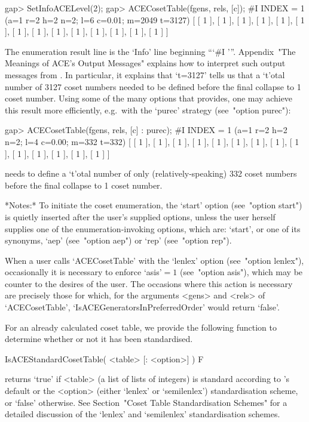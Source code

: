 \beginexample
gap> SetInfoACELevel(2);
gap> ACECosetTable(fgens, rels, [c]);
#I  INDEX = 1 (a=1 r=2 h=2 n=2; l=6 c=0.01; m=2049 t=3127)
[ [ 1 ], [ 1 ], [ 1 ], [ 1 ], [ 1 ], [ 1 ], [ 1 ], [ 1 ], [ 1 ], [ 1 ], 
  [ 1 ], [ 1 ], [ 1 ], [ 1 ] ]
\endexample

The enumeration result line is the `Info' line  beginning  ```\#I '''.
Appendix~"The Meanings of  ACE's  Output  Messages"  explains  how  to
interpret such output messages from {\ACE}. In particular, it explains
that `t=3127' tells us that a `t'otal number  of  3127  coset  numbers
needed to be defined before the final  collapse  to  1  coset  number.
Using some of the many options that {\ACE} provides, one  may  achieve
this  result  more  efficiently,  e.g.~with   the   `purec'   strategy
(see~"option purec"):

\beginexample
gap> ACECosetTable(fgens, rels, [c] : purec);
#I  INDEX = 1 (a=1 r=2 h=2 n=2; l=4 c=0.00; m=332 t=332)
[ [ 1 ], [ 1 ], [ 1 ], [ 1 ], [ 1 ], [ 1 ], [ 1 ], [ 1 ], [ 1 ], [ 1 ], 
  [ 1 ], [ 1 ], [ 1 ], [ 1 ] ]
\endexample

{\ACE} needs to define a `t'otal number of only  (relatively-speaking)
332 coset numbers before the final collapse to 1 coset number.

*Notes:* 
To initiate the coset enumeration,  the  `start'  option  (see~"option
start") is quietly inserted after the user's supplied options,  unless
the user herself supplies one  of  the  enumeration-invoking  options,
which are: `start', or one of its synonyms, `aep'  (see~"option  aep")
or `rep' (see~"option rep").

When  a  user  calls  `ACECosetTable'   with   the   `lenlex'   option
(see~"option  lenlex"),  occasionally  it  is  necessary  to   enforce
`asis'${}=1$ (see~"option asis"), which may be counter to the  desires
of the  user.  The  occasions  where  this  action  is  necessary  are
precisely those for which, for the  arguments  <gens>  and  <rels>  of
`ACECosetTable',   `IsACEGeneratorsInPreferredOrder'   would    return
`false'.

For an already  calculated  coset  table,  we  provide  the  following
function to determine whether or not it has been standardised.

\>IsACEStandardCosetTable( <table> [: <option>] ) F

returns `true' if <table> (a list of lists of  integers)  is  standard
according to {\GAP}'s default or  the  <option>  (either  `lenlex'  or
`semilenlex')  standardisation  scheme,  or  `false'  otherwise.   See
Section~"Coset  Table  Standardisation   Schemes"   for   a   detailed
discussion of the `lenlex' and `semilenlex' standardisation schemes.

